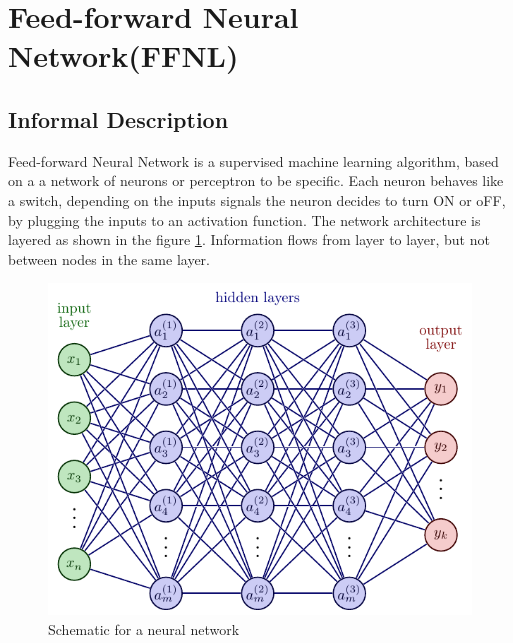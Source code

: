 \documentclass{article}
\begin{document}
\section{Feed-forward Neural Network(FFNL)}
\subsection{Informal Description}
Feed-forward Neural Network is a supervised machine learning algorithm, based on a a network of neurons 
or perceptron to be specific.  Each neuron behaves like a switch, depending on the inputs signals the neuron decides to 
turn ON or oFF, by plugging the inputs to an activation function. The network architecture is layered as shown in the figure \ref{fig:ffnl}.
Information flows from layer to layer, but not between nodes in the same layer. 
\begin{figure}
    \centering
    \includegraphics[scale=1]{ffnl.pdf}
    \caption{Schematic for a neural network}
    \label{fig:ffnl}
\end{figure}
\end{document}
